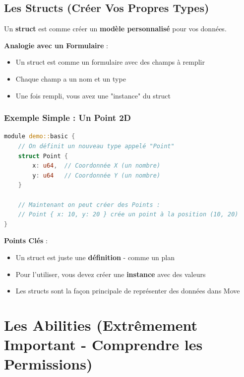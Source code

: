 \documentclass[11pt]{article}
\begin{document}
\subsection{Les Structs (Créer Vos Propres Types)}

Un \textbf{struct} est comme créer un \textbf{modèle personnalisé} pour vos données.

\begin{explainBox}
\textbf{Analogie avec un Formulaire} :
\begin{itemize}
  \item Un struct est comme un formulaire avec des champs à remplir
  \item Chaque champ a un nom et un type
  \item Une fois rempli, vous avez une "instance" du struct
\end{itemize}
\end{explainBox}

\subsubsection{Exemple Simple : Un Point 2D}

\begin{lstlisting}[language=Rust, caption=Struct Point - Exemple Basique]
module demo::basic {
    // On définit un nouveau type appelé "Point"
    struct Point {
        x: u64,  // Coordonnée X (un nombre)
        y: u64   // Coordonnée Y (un nombre)
    }
    
    // Maintenant on peut créer des Points :
    // Point { x: 10, y: 20 } crée un point à la position (10, 20)
}
\end{lstlisting}

\begin{noteBox}
\textbf{Points Clés} :
\begin{itemize}
  \item Un struct est juste une \textbf{définition} - comme un plan
  \item Pour l'utiliser, vous devez créer une \textbf{instance} avec des valeurs
  \item Les structs sont la façon principale de représenter des données dans Move
\end{itemize}
\end{noteBox}

\section{Les Abilities (Extrêmement Important - Comprendre les Permissions)}
\end{document}
